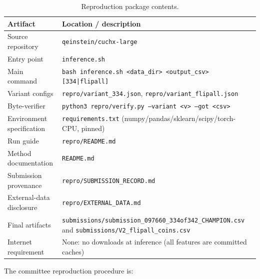 \documentclass[12pt,a4paper]{article}
\begin{document}
\begin{table}[ht]
\centering
\small
\begin{tabularx}{\textwidth}{p{4.8cm}X}
\toprule
\textbf{Artifact} & \textbf{Location / description} \\
\midrule

Source repository &
\texttt{qeinstein/cuchx-large} \\

Entry point &
\texttt{inference.sh} \\

Main command &
\texttt{bash inference.sh <data\_dir> <output\_csv> [334|flipall]} \\

Variant configs &
\texttt{repro/variant\_334.json}, \texttt{repro/variant\_flipall.json} \\

Byte-verifier &
\texttt{python3 repro/verify.py --variant <v> --got <csv>} \\

Environment specification &
\texttt{requirements.txt} (numpy/pandas/sklearn/scipy/torch-CPU, pinned) \\

Run guide &
\texttt{repro/README.md} \\

Method documentation &
\texttt{README.md} \\

Submission provenance &
\texttt{repro/SUBMISSION\_RECORD.md} \\

External-data disclosure &
\texttt{repro/EXTERNAL\_DATA.md} \\

Final artifacts &
\texttt{submissions/submission\_097660\_334of342\_CHAMPION.csv} and
\texttt{submissions/V2\_flipall\_coins.csv} \\

Internet requirement &
None: no downloads at inference (all features are committed caches) \\

\bottomrule
\end{tabularx}
\caption{Reproduction package contents.}
\end{table}

The committee reproduction procedure is:
\end{document}
